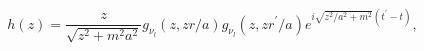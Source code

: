 \begin{equation}
h(z)=\frac{z}{\sqrt{z^{2}+m^{2}a^{2}}}g_{\nu _{l}}(z,zr/a)g_{\nu
_{l}}(z,zr^{\prime }/a)e^{i\sqrt{z^{2}/a^{2}+m^{2}}(t^{\prime
}-t)}, \label{hab}
\end{equation}

